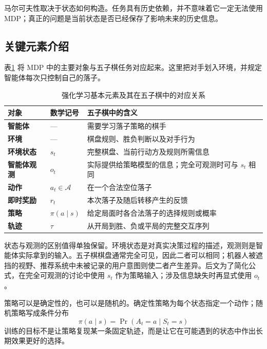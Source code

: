 \begin{importantnote}
马尔可夫性取决于状态如何构造。任务具有历史依赖，并不意味着它一定无法使用 MDP；真正的问题是当前状态是否已经保存了影响未来的历史信息。
\end{importantnote}

\subsection{关键元素介绍}

表\ref{tab:rl-elements} 将 MDP 中的主要对象与五子棋任务对应起来。这里把对手划入环境，并规定智能体每次只控制自己的落子。

\begin{table}[htbp]
  \centering
  \caption{强化学习基本元素及其在五子棋中的对应关系}
  \label{tab:rl-elements}
  \begin{tabularx}{\linewidth}{>{\bfseries}p{2.2cm}p{3.2cm}X}
    \toprule
    对象 & 数学记号 & 五子棋中的含义 \\
    \midrule
    智能体 & --- & 需要学习落子策略的棋手 \\
    环境 & --- & 棋盘规则、胜负判断以及对手行为 \\
    环境状态 & $s_t$ & 完整棋盘、当前行动方及规则所需信息 \\
    智能体观测 & $o_t$ & 实际提供给策略模型的信息；完全可观测时可与 $s_t$ 相同 \\
    动作 & $a_t\in\mathcal A$ & 在一个合法空位落子 \\
    即时奖励 & $r_t$ & 本次落子及随后转移产生的反馈 \\
    策略 & $\pi(a\mid s)$ & 给定局面时各合法落子的选择规则或概率 \\
    轨迹 & $\tau$ & 从开局到胜、负或平局的完整交互序列 \\
    \bottomrule
  \end{tabularx}
\end{table}

状态与观测的区别值得单独保留。环境状态是对真实决策过程的描述，观测则是智能体实际拿到的输入。五子棋棋盘通常完全可见，因此二者可以相同；机器人被遮挡的视野、推荐系统中未被记录的用户意图则使二者产生差异。后文为了简化公式，在完全可观测的讨论中使用 \(s_t\) 作为策略输入；涉及信息缺失时再显式使用 \(o_t\)。

策略可以是确定性的，也可以是随机的。确定性策略为每个状态指定一个动作；随机策略写成条件分布
\begin{equation}
\pi(a\mid s)=\Pr(A_t=a\mid S_t=s)
\end{equation}
训练的目标不是让策略复现某一条固定轨迹，而是让它在可能遇到的状态中作出长期效果更好的选择。

